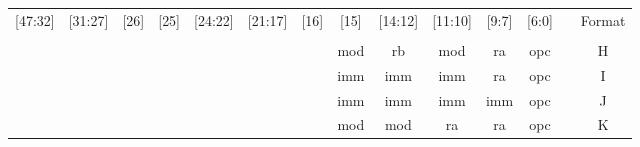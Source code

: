 
\begin{table}
\centering
\begin{tabular}{c|c|c|c|c|c|c|c|c|c|c|c|r|c|} 
\cline{1-12}\cline{14-14}
\multicolumn{1}{|c|}{{[}47:32]} & {[}31:27]            & {[}26]               & {[}25]               & {[}24:22]            & {[}21:17]            & {[}16]                & {[}15]               & {[}14:12]            & {[}11:10]            & {[}9:7]              & {[}6:0]              &                       & \multicolumn{1}{l|}{Format}  \\ 
\cline{1-12}\cline{14-14}
\multicolumn{1}{c}{}            & \multicolumn{1}{c}{} & \multicolumn{1}{c}{} & \multicolumn{1}{c}{} & \multicolumn{1}{c}{} & \multicolumn{1}{c}{} & \multicolumn{1}{c}{}  & \multicolumn{1}{c}{} & \multicolumn{1}{c}{} & \multicolumn{1}{c}{} & \multicolumn{1}{c}{} & \multicolumn{1}{c}{} & \multicolumn{1}{r}{}  & \multicolumn{1}{l}{}         \\ 
\cline{8-12}\cline{14-14}
\multicolumn{1}{c}{}            & \multicolumn{1}{c}{} & \multicolumn{1}{c}{} & \multicolumn{1}{c}{} & \multicolumn{1}{c}{} & \multicolumn{1}{c}{} &                       & mod                  & rb                   & mod                  & ra                   & opc                  &                       & H                            \\ 
\cline{8-12}\cline{14-14}
\multicolumn{1}{c}{}            & \multicolumn{1}{c}{} & \multicolumn{1}{c}{} & \multicolumn{1}{c}{} & \multicolumn{1}{c}{} & \multicolumn{1}{c}{} &                       & imm                  & imm                  & imm                  & ra                   & opc                  &                       & I                            \\ 
\cline{8-12}\cline{14-14}
\multicolumn{1}{c}{}            & \multicolumn{1}{c}{} & \multicolumn{1}{c}{} & \multicolumn{1}{c}{} & \multicolumn{1}{c}{} & \multicolumn{1}{c}{} &                       & imm                  & imm                  & imm                  & imm                  & opc                  &                       & J                            \\ 
\cline{8-12}\cline{14-14}
\multicolumn{1}{l}{}            & \multicolumn{1}{l}{} & \multicolumn{1}{l}{} & \multicolumn{1}{l}{} & \multicolumn{1}{l}{} & \multicolumn{1}{l}{} & \multicolumn{1}{l|}{} & mod                  & mod                  & ra                   & ra                   & opc                  & \multicolumn{1}{l|}{} & K                            \\ 

\end{tabular}
\end{table}
